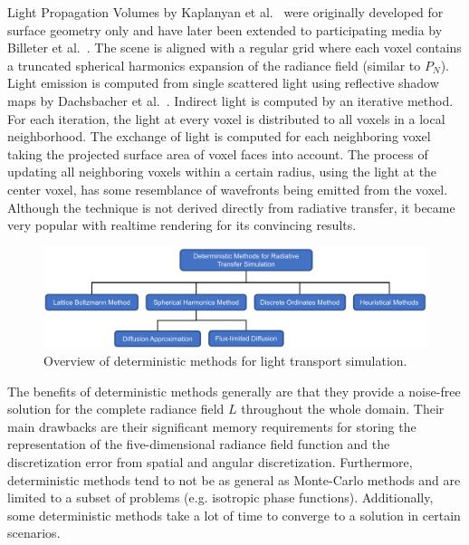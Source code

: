 Light Propagation Volumes by Kaplanyan et al.~\cite{Kaplanyan10} were originally developed for surface geometry only and have later been extended to participating media by Billeter et al.~\cite{Billeter12}. The scene is aligned with a regular grid where each voxel contains a truncated spherical harmonics expansion of the radiance field (similar to $P_N$). Light emission is computed from single scattered light using reflective shadow maps by Dachsbacher et al.~\cite{Dachsbacher05}. Indirect light is computed by an iterative method. For each iteration, the light at every voxel is distributed to all voxels in a local neighborhood. The exchange of light is computed for each neighboring voxel taking the projected surface area of voxel faces into account. The process of updating all neighboring voxels within a certain radius, using the light at the center voxel, has some resemblance of wavefronts being emitted from the voxel. Although the technique is not derived directly from radiative transfer, it became very popular with realtime rendering for its convincing results.


\begin{figure}[t]
\centering
\includegraphics[width=1.0\textwidth]{03_foundations_of_light_transport_simulation/figures/fig_overview_methods.pdf}
\caption{Overview of deterministic methods for light transport simulation.}
\label{fig:rte_change_L_all}
\end{figure}

The benefits of deterministic methods generally are that they provide a noise-free solution for the complete radiance field $L$ throughout the whole domain. Their main drawbacks are their significant memory requirements for storing the representation of the five-dimensional radiance field function and the discretization error from spatial and angular discretization. Furthermore, deterministic methods tend to not be as general as Monte-Carlo methods and are limited to a subset of problems (e.g. isotropic phase functions). Additionally, some deterministic methods take a lot of time to converge to a solution in certain scenarios.

